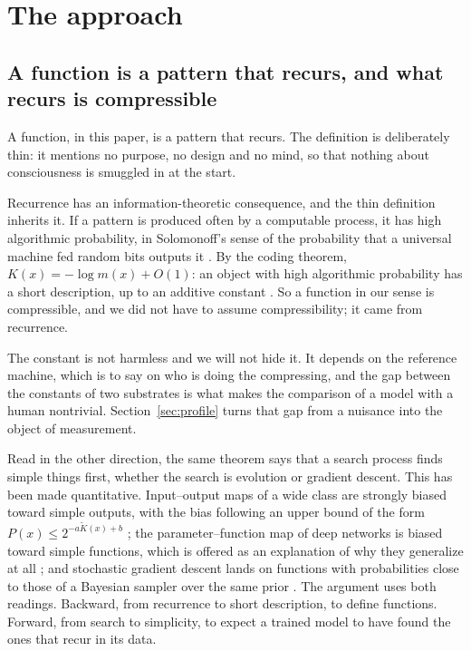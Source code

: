 \section{The approach}
\label{sec:approach}

\subsection{A function is a pattern that recurs, and what recurs is compressible}
\label{sec:function}

A function, in this paper, is a pattern that recurs. The definition is deliberately thin: it mentions no
purpose, no design and no mind, so that nothing about consciousness is smuggled in at the start.

Recurrence has an information-theoretic consequence, and the thin definition inherits it. If a pattern is produced
often by a computable process, it has high algorithmic probability, in Solomonoff's sense of the
probability that a universal machine fed random bits outputs it \citep{solomonoff1964a,solomonoff1964b}.
By the coding theorem, $K(x) = -\log m(x) + O(1)$: an object with high algorithmic probability has a
short description, up to an additive constant \citep{levin1974,livitanyi2019}. So a function in our
sense is compressible, and we did not have to assume compressibility; it came from recurrence.

The constant is not harmless and we will not hide it. It depends on the reference machine, which is to
say on who is doing the compressing, and the gap between the constants of two substrates is
what makes the comparison of a model with a human nontrivial. Section~\ref{sec:profile} turns that gap
from a nuisance into the object of measurement.

Read in the other direction, the same theorem says that a search process finds simple things first,
whether the search is evolution or gradient descent. This has been made quantitative. Input--output
maps of a wide class are strongly biased toward simple outputs, with the bias following an upper bound
of the form $P(x) \le 2^{-a \tilde{K}(x) + b}$ \citep{dingle2018}; the parameter--function map of deep
networks is biased toward simple functions, which is offered as an explanation of why they generalize
at all \citep{valleperez2019}; and stochastic gradient descent lands on functions with probabilities
close to those of a Bayesian sampler over the same prior \citep{mingard2021}. The argument uses both
readings. Backward, from recurrence to short description, to define functions. Forward, from search to
simplicity, to expect a trained model to have found the ones that recur in its data.

